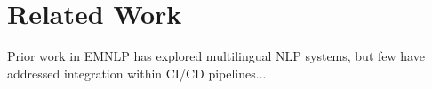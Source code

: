  \section{Related Work}
Prior work in EMNLP has explored multilingual NLP systems, but few have addressed integration within CI/CD pipelines...
